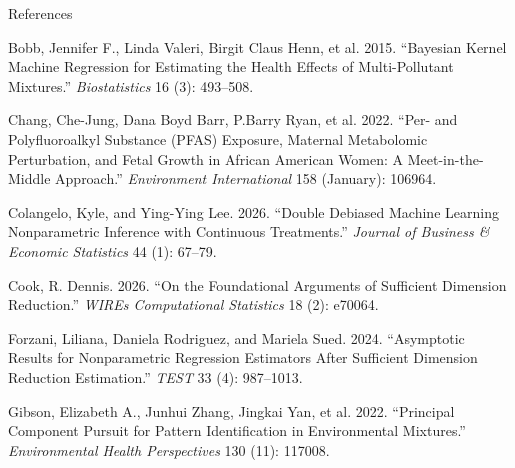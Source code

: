 \documentclass[
  ignorenonframetext,
  aspectratio=169,
  11pt]{beamer}
\newlength{\cslhangindent}
\newenvironment{CSLReferences}[2] %
 {\begin{list}{}{%
  \setlength{\itemindent}{0pt}
  \setlength{\leftmargin}{0pt}
  \setlength{\parsep}{0pt}
  \ifodd #1
   \setlength{\leftmargin}{\cslhangindent}
   \setlength{\itemindent}{-1\cslhangindent}
  \fi
  \setlength{\itemsep}{#2\baselineskip}}}
 {\end{list}}
\begin{document}
\begin{frame}[allowframebreaks]{References}
\protect{}\label{references}
\fontsize{6}{6.5}\selectfont
{}
\renewenvironment{CSLReferences}[2]
  {\begin{list}{}{%
    \setlength{\leftmargin}{1em}%
    \setlength{\itemindent}{-1em}%
    \setlength{\parsep}{0pt}%
    \setlength{\itemsep}{0pt}%
    \setlength{\topsep}{0pt}}%
    \fontsize{6}{6.5}\selectfont}
  {\end{list}}

\protect{}\label{refs}
\begin{CSLReferences}{1}{1}
Bobb, Jennifer F., Linda Valeri, Birgit Claus Henn, et al. 2015.
{``Bayesian Kernel Machine Regression for Estimating the Health Effects
of Multi-Pollutant Mixtures.''} \emph{Biostatistics} 16 (3): 493--508.

Chang, Che-Jung, Dana Boyd Barr, P.Barry Ryan, et al. 2022. {``Per- and
Polyfluoroalkyl Substance ({PFAS}) Exposure, Maternal Metabolomic
Perturbation, and Fetal Growth in {African American} Women: {A}
Meet-in-the-Middle Approach.''} \emph{Environment International} 158
(January): 106964.

Colangelo, Kyle, and Ying-Ying Lee. 2026. {``Double {Debiased Machine
Learning Nonparametric Inference} with {Continuous Treatments}.''}
\emph{Journal of Business \& Economic Statistics} 44 (1): 67--79.

Cook, R. Dennis. 2026. {``On the {Foundational Arguments} of {Sufficient
Dimension Reduction}.''} \emph{WIREs Computational Statistics} 18 (2):
e70064.

Forzani, Liliana, Daniela Rodriguez, and Mariela Sued. 2024.
{``Asymptotic Results for Nonparametric Regression Estimators After
Sufficient Dimension Reduction Estimation.''} \emph{TEST} 33 (4):
987--1013.

Gibson, Elizabeth A., Junhui Zhang, Jingkai Yan, et al. 2022.
{``Principal {Component Pursuit} for {Pattern Identification} in
{Environmental Mixtures}.''} \emph{Environmental Health Perspectives}
130 (11): 117008.


\end{CSLReferences}
\end{frame}
\end{document}
